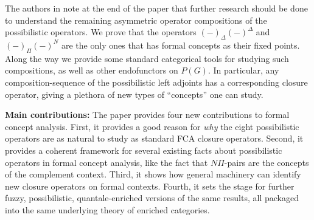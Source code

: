 The authors in \cite{yakub-djouadi-dubois-prade_2016} note at the end of the paper that further research should be done to understand the remaining asymmetric operator compositions of the possibilistic operators. We prove that the operators $(-)_\Delta (-)^\Delta$ and $(-)_\Pi (-)^N$ are the only ones that has formal concepts as their fixed points. Along the way we provide some standard categorical tools for studying such compositions, as well as other endofunctors on $P(G)$. In particular, any composition-sequence of the possibilistic left adjoints has a corresponding closure operator, giving a plethora of new types of ``concepts'' one can study.  

\textbf{Main contributions:} The paper provides four new contributions to formal concept analysis. First, it provides a good reason for \emph{why} the eight possibilistic operators are as natural to study as standard FCA closure operators. Second, it provides a coherent framework for several existing facts about possibilistic operators in formal concept analysis, like the fact that $N\Pi$-pairs are the concepts of the complement context. Third, it shows how general machinery can identify new closure operators on formal contexts. Fourth, it sets the stage for further fuzzy, possibilistic, quantale-enriched versions of the same results, all packaged into the same underlying theory of enriched categories. 